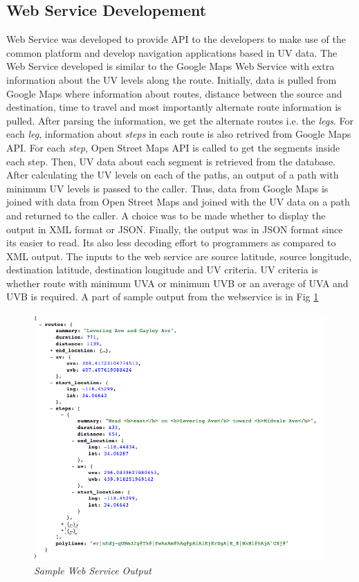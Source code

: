\documentclass[12pt,fullpage,doublespace]{article}
\begin{document}
\subsection{Web Service Developement}
Web Service was developed to provide API to the developers to make use of the common platform and develop navigation applications based in UV data. The Web Service developed is similar to the Google Maps Web Service \cite{googleWebService} with extra information about the UV levels along the route. Initially, data is pulled from Google Maps where information about routes, distance between the source and destination, time to travel and most importantly alternate route information is pulled. After parsing the information, we get the alternate routes i.e. the {\it legs}. For each {\it leg}, information about {\it steps} in each route is also retrived from Google Maps API. For each {\it step}, Open Street Maps API is called to get the segments inside each step. Then, UV data about each segment is retrieved from the database. After calculating the UV levels on each of the paths, an output of a path with minimum UV levels is passed to the caller. Thus, data from Google Maps is joined with data from Open Street Maps and joined with the UV data on a path and returned to the caller. A choice was to be made whether to display the output in XML format or JSON. Finally, the output was in JSON format since its easier to read. Its also less decoding effort to programmers as compared to XML output. The inputs to the web service are source latitude, source longitude, destination latitude, destination longitude and UV criteria. UV criteria is whether route with minimum UVA or minimum UVB or an average of UVA and UVB is required. A part of sample output from the webservice is in Fig 
\ref{fig:webServiceOutput}
\begin{figure}[h]
\begin{center}
\includegraphics[scale=0.4]{webServiceOutput.png}
\caption{\small \sl Sample Web Service Output}
\label{fig:webServiceOutput}
\end{center}
\end{figure}
\clearpage
\end{document}
